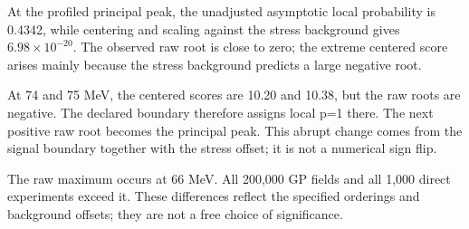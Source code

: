 At the profiled principal peak, the unadjusted asymptotic local probability is 0.4342, while centering and scaling against the stress background gives $6.98\times10^{-20}$. The observed raw root is close to zero; the extreme centered score arises mainly because the stress background predicts a large negative root. 

At 74 and 75 MeV, the centered scores are 10.20 and 10.38, but the raw roots are negative. The declared boundary therefore assigns local p=1 there. The next positive raw root becomes the principal peak. This abrupt change comes from the signal boundary together with the stress offset; it is not a numerical sign flip. 

The raw maximum occurs at 66 MeV. All 200,000 GP fields and all 1,000 direct experiments exceed it. These differences reflect the specified orderings and background offsets; they are not a free choice of significance.
